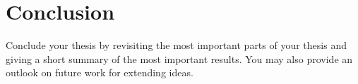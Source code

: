 \chapter{Conclusion}
Conclude your thesis by revisiting the most important parts of your thesis and giving a short summary of the most important results.
You may also provide an outlook on future work for extending ideas.
